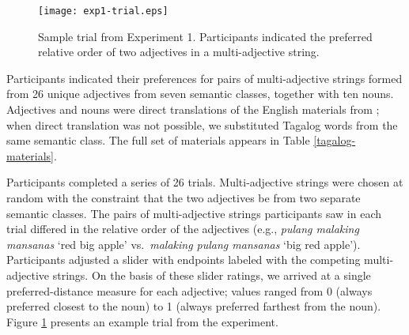 \documentclass[12pt,letterpaper]{article}
\begin{document}
\begin{figure}
\centering
\texttt{[image: exp1-trial.eps]}
\caption{Sample trial from Experiment 1. Participants indicated the preferred relative order of two adjectives in a multi-adjective string.
}
\label{exp1-trial}
\end{figure}

Participants indicated their preferences for pairs of multi-adjective strings formed from 26 unique adjectives from seven semantic classes, together with ten nouns. Adjectives and nouns were direct translations of the English materials from \cite{scontrasetal2017adjectives}; when direct translation was not possible, we substituted Tagalog words from the same semantic class. The full set of materials appears in Table \ref{tagalog-materials}.

Participants completed a series of 26 trials. Multi-adjective strings were chosen at random with the constraint that the two adjectives be from two separate semantic classes. The pairs of multi-adjective strings participants saw in each trial differed in the relative order of the adjectives (e.g., \emph{pulang malaking mansanas} `red big apple' vs.~\emph{malaking pulang mansanas} `big red apple'). Participants adjusted a slider with endpoints labeled with the competing multi-adjective strings. On the basis of these slider ratings, we arrived at a single preferred-distance measure for each adjective; values ranged from 0 (always preferred closest to the noun) to 1 (always preferred farthest from the noun). Figure \ref{exp1-trial} presents an example trial from the experiment.

\end{document}
